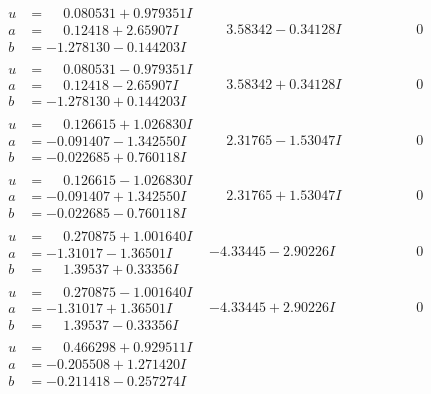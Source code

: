 \documentclass[1p]{elsarticle_modified}
\theoremstyle{definition}
\begin{document}
$$\begin{array}{c|c|c}
\begin{aligned}
u &= \phantom{-}0.080531 + 0.979351 I \\
a &= \phantom{-}0.12418 + 2.65907 I \\
b &= -1.278130 - 0.144203 I\end{aligned}
 & \phantom{-}3.58342 - 0.34128 I & \phantom{-0.000000 } 0 \\ \hline\begin{aligned}
u &= \phantom{-}0.080531 - 0.979351 I \\
a &= \phantom{-}0.12418 - 2.65907 I \\
b &= -1.278130 + 0.144203 I\end{aligned}
 & \phantom{-}3.58342 + 0.34128 I & \phantom{-0.000000 } 0 \\ \hline\begin{aligned}
u &= \phantom{-}0.126615 + 1.026830 I \\
a &= -0.091407 - 1.342550 I \\
b &= -0.022685 + 0.760118 I\end{aligned}
 & \phantom{-}2.31765 - 1.53047 I & \phantom{-0.000000 } 0 \\ \hline\begin{aligned}
u &= \phantom{-}0.126615 - 1.026830 I \\
a &= -0.091407 + 1.342550 I \\
b &= -0.022685 - 0.760118 I\end{aligned}
 & \phantom{-}2.31765 + 1.53047 I & \phantom{-0.000000 } 0 \\ \hline\begin{aligned}
u &= \phantom{-}0.270875 + 1.001640 I \\
a &= -1.31017 - 1.36501 I \\
b &= \phantom{-}1.39537 + 0.33356 I\end{aligned}
 & -4.33445 - 2.90226 I & \phantom{-0.000000 } 0 \\ \hline\begin{aligned}
u &= \phantom{-}0.270875 - 1.001640 I \\
a &= -1.31017 + 1.36501 I \\
b &= \phantom{-}1.39537 - 0.33356 I\end{aligned}
 & -4.33445 + 2.90226 I & \phantom{-0.000000 } 0 \\ \hline\begin{aligned}
u &= \phantom{-}0.466298 + 0.929511 I \\
a &= -0.205508 + 1.271420 I \\
b &= -0.211418 - 0.257274 I\end{aligned}

\end{array}$$
\end{document}
